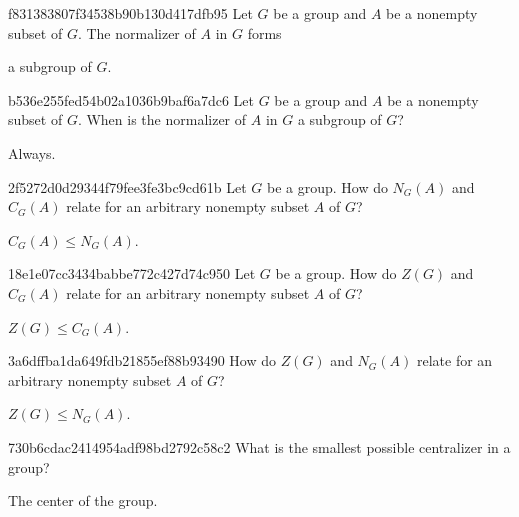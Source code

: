 \begin{note}{f831383807f34538b90b130d417dfb95}
    Let \({ G }\) be a group and \({ A }\) be a nonempty subset of \({ G }\).
    The normalizer of \({ A }\) in \({ G }\) forms \begin{icloze}{1}a subgroup of \({ G }\).\end{icloze}
\end{note}

\begin{note}{b536e255fed54b02a1036b9baf6a7dc6}
    Let \({ G }\) be a group and \({ A }\) be a nonempty subset of \({ G }\).
    When is the normalizer of \({ A }\) in \({ G }\) a subgroup of \({ G }\)?

    \begin{cloze}{1}
        Always.
    \end{cloze}
\end{note}

\begin{note}{2f5272d0d29344f79fee3fe3bc9cd61b}
    Let \({ G }\) be a group.
    How do \({ N_G(A) }\) and \({ C_G(A) }\) relate for an arbitrary nonempty subset \({ A }\) of \({ G }\)?

    \begin{cloze}{1}
        \({ C_G(A) \leq N_G(A) }\).
    \end{cloze}
\end{note}

\begin{note}{18e1e07cc3434babbe772c427d74c950}
    Let \({ G }\) be a group.
    How do \({ Z(G) }\) and \({ C_G(A) }\) relate for an arbitrary nonempty subset \({ A }\) of \({ G }\)?

    \begin{cloze}{1}
        \({ Z(G) \leq C_G(A) }\).
    \end{cloze}
\end{note}

\begin{note}{3a6dffba1da649fdb21855ef88b93490}
    How do \({ Z(G) }\) and \({ N_G(A) }\) relate for an arbitrary nonempty subset \({ A }\) of \({ G }\)?

    \begin{cloze}{1}
        \({ Z(G) \leq N_G(A) }\).
    \end{cloze}
\end{note}

\begin{note}{730b6cdac2414954adf98bd2792c58c2}
    What is the smallest possible centralizer in a group?

    \begin{cloze}{1}
        The center of the group.
    \end{cloze}
\end{note}

